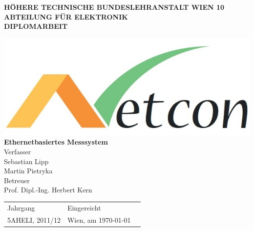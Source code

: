 \documentclass[a4paper,14pt,headsepline]{scrartcl}
\begin{document}
\begin{titlepage}
    \begin{center}

\begin{center}
\textbf{HÖHERE TECHNISCHE BUNDESLEHRANSTALT WIEN 10 ABTEILUNG FÜR ELEKTRONIK}\\
 \vspace{2cm}
\LARGE\textbf{\textsc{DIPLOMARBEIT}}\\
     \vspace{2cm}
     
     
\includegraphics[width=0.35 \paperwidth]{./bilder/logo.jpeg} \\
 \huge \textbf{\textsf{Ethernetbasiertes Messsystem}} \\
\vspace{1cm}
Verfasser \\
\vspace{0.5cm}
 \normalsize Sebastian Lipp \\
 Martin Pietryka \\
  
\vspace{1cm}
\huge Betreuer \\
\vspace{0.5cm}
 \normalsize Prof. Dipl.-Ing. Herbert Kern \\
 
 \end{center}
 
 \vspace{2cm}
 
\huge
 \begin{tabular}{L{5cm}R{10cm}l}
 
    	Jahrgang         & {Eingereicht} \\
	\normalsize
    	5AHELI, 2011/12 & {\normalsize Wien, am \today} \\

\end{tabular}\\
  
\end{center}

\end{titlepage}
\end{document}
